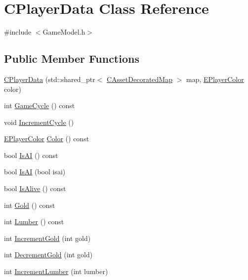 \hypertarget{classCPlayerData}{}\section{C\+Player\+Data Class Reference}
\label{classCPlayerData}


{\ttfamily \#include $<$Game\+Model.\+h$>$}

\subsection*{Public Member Functions}
\begin{DoxyCompactItemize}
\item 
\hyperlink{classCPlayerData_af60332b967ddb3044bd71376656bcdc0}{C\+Player\+Data} (std\+::shared\+\_\+ptr$<$ \hyperlink{classCAssetDecoratedMap}{C\+Asset\+Decorated\+Map} $>$ map, \hyperlink{GameDataTypes_8h_aafb0ca75933357ff28a6d7efbdd7602f}{E\+Player\+Color} color)
\item 
int \hyperlink{classCPlayerData_a91ef320747b0c6281c05a9284279e16a}{Game\+Cycle} () const
\item 
void \hyperlink{classCPlayerData_a6fbfd47b568e721df80644689f8dd172}{Increment\+Cycle} ()
\item 
\hyperlink{GameDataTypes_8h_aafb0ca75933357ff28a6d7efbdd7602f}{E\+Player\+Color} \hyperlink{classCPlayerData_a4f313db2728a8be2b24484515a2445df}{Color} () const
\item 
bool \hyperlink{classCPlayerData_ac68129067db822343e68b307de53e11c}{Is\+AI} () const
\item 
bool \hyperlink{classCPlayerData_a20d6aa66a3483ad16052b0afea928ec6}{Is\+AI} (bool isai)
\item 
bool \hyperlink{classCPlayerData_a46ba3f00069e6da5cf4a1203a7456e1d}{Is\+Alive} () const
\item 
int \hyperlink{classCPlayerData_afa5c728fc86335a9ca00b5121c0ec765}{Gold} () const
\item 
int \hyperlink{classCPlayerData_a73b2e6868bd85953604412904a20316a}{Lumber} () const
\item 
int \hyperlink{classCPlayerData_a4d99d876561ac76a9d4f7a3e2f7f3edb}{Increment\+Gold} (int gold)
\item 
int \hyperlink{classCPlayerData_ac072cd77c60b35920a278aaffcefd3fd}{Decrement\+Gold} (int gold)
\item 
int \hyperlink{classCPlayerData_a4115ca5ce5e6f10e64c0a310d5348c93}{Increment\+Lumber} (int lumber)
\item 

\end{DoxyCompactItemize}
